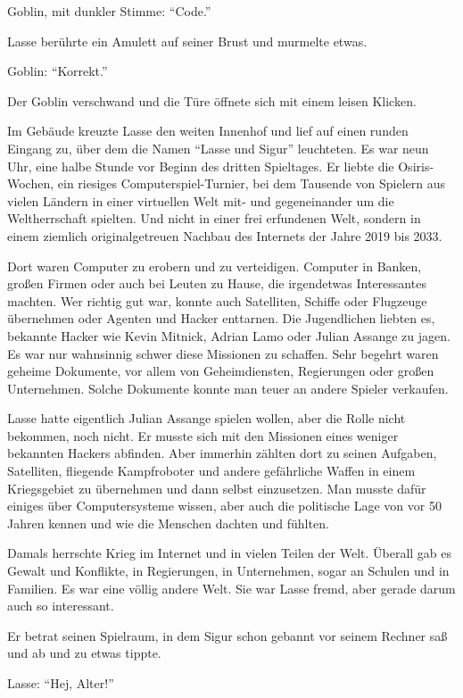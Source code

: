 Goblin, mit dunkler Stimme: \enquote{Code.}

Lasse berührte ein Amulett auf seiner Brust und murmelte etwas.

Goblin: \enquote{Korrekt.}

Der Goblin verschwand und die Türe öffnete sich mit einem leisen Klicken.

Im Gebäude kreuzte Lasse den weiten Innenhof und lief auf einen runden Eingang zu, über dem die Namen \enquote{Lasse und Sigur} leuchteten.
Es war neun Uhr, eine halbe Stunde vor Beginn des dritten Spieltages.
Er liebte die Osiris-Wochen, ein riesiges Computerspiel-Turnier, bei dem Tausende von Spielern aus vielen Ländern in einer virtuellen Welt mit- und gegeneinander um die Weltherrschaft spielten.
Und nicht in einer frei erfundenen Welt, sondern in einem ziemlich originalgetreuen Nachbau des Internets der Jahre 2019 bis 2033.

Dort waren Computer zu erobern und zu verteidigen.
Computer in Banken, großen Firmen oder auch bei Leuten zu Hause, die irgendetwas Interessantes machten.
Wer richtig gut war, konnte auch Satelliten, Schiffe oder Flugzeuge übernehmen oder Agenten und Hacker enttarnen.
Die Jugendlichen liebten es, bekannte Hacker wie Kevin Mitnick, Adrian Lamo oder Julian Assange zu jagen.
Es war nur wahnsinnig schwer diese Missionen zu schaffen.
Sehr begehrt waren geheime Dokumente, vor allem von Geheimdiensten, Regierungen oder großen Unternehmen.
Solche Dokumente konnte man teuer an andere Spieler verkaufen.

Lasse hatte eigentlich Julian Assange spielen wollen, aber die Rolle nicht bekommen, noch nicht.
Er musste sich mit den Missionen eines weniger bekannten Hackers abfinden.
Aber immerhin zählten dort zu seinen Aufgaben, Satelliten, fliegende Kampfroboter und andere gefährliche Waffen in einem Kriegsgebiet zu übernehmen und dann selbst einzusetzen.
Man musste dafür einiges über Computersysteme wissen, aber auch die politische Lage von vor 50 Jahren kennen und wie die Menschen dachten und fühlten.

Damals herrschte Krieg im Internet und in vielen Teilen der Welt.
Überall gab es Gewalt und Konflikte, in Regierungen, in Unternehmen, sogar an Schulen und in Familien.
Es war eine völlig andere Welt.
Sie war Lasse fremd, aber gerade darum auch so interessant.

Er betrat seinen Spielraum, in dem Sigur schon gebannt vor seinem Rechner saß und ab und zu etwas tippte.

Lasse: \enquote{Hej, Alter!}

